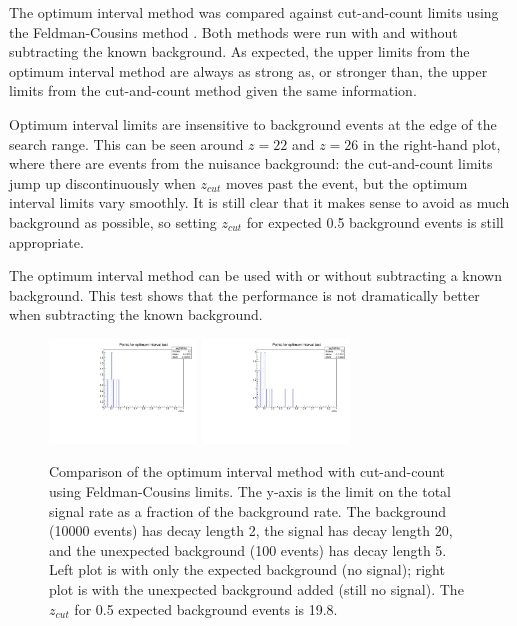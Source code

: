 The optimum interval method was compared against cut-and-count limits using the Feldman-Cousins method \cite{feldman_unified_1998}.
Both methods were run with and without subtracting the known background.
As expected, the upper limits from the optimum interval method are always as strong as, or stronger than, the upper limits from the cut-and-count method given the same information.

Optimum interval limits are insensitive to background events at the edge of the search range.
This can be seen around $z=22$ and $z=26$ in the right-hand plot, where there are events from the nuisance background: the cut-and-count limits jump up discontinuously when $z_{cut}$ moves past the event, but the optimum interval limits vary smoothly.
It is still clear that it makes sense to avoid as much background as possible, so setting $z_{cut}$ for expected 0.5 background events is still appropriate.

The optimum interval method can be used with or without subtracting a known background.
This test shows that the performance is not dramatically better when subtracting the known background.

\begin{figure}[ht]
\begin{center}
    \includegraphics[width=0.35\textwidth,page=5,angle=-90]{vertexing/figs/toy_nothing}
    \includegraphics[width=0.35\textwidth,page=5,angle=-90]{vertexing/figs/toy_nosignal}
\end{center}
    \caption{Comparison of the optimum interval method with cut-and-count using Feldman-Cousins limits. The y-axis is the limit on the total signal rate as a fraction of the background rate. 
        The background (10000 events) has decay length 2, the signal has decay length 20, and the unexpected background (100 events) has decay length 5. Left plot is with only the expected background (no signal); right plot is with the unexpected background added (still no signal). The $z_{cut}$ for 0.5 expected background events is 19.8.}
    \label{fig:optimum_interval_demo}
\end{figure}

